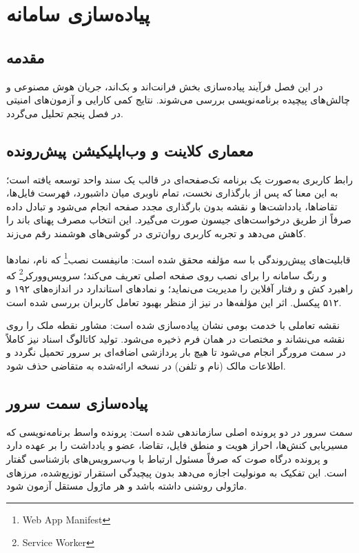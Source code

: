 \documentclass[11pt, a4paper]{report}
\newcommand{\enfootnote}[1]{\footnote{\foreignlanguage{english}{#1}}}
\begin{document}
\chapter{پیاده‌سازی سامانه}

\section{مقدمه}
در این فصل فرآیند پیاده‌سازی بخش فرانت‌اند و بک‌اند، جریان هوش مصنوعی و چالش‌های پیچیده برنامه‌نویسی بررسی می‌شوند. نتایج کمی کارایی و آزمون‌های امنیتی در فصل پنجم تحلیل می‌گردد.

\section{معماری کلاینت و وب‌اپلیکیشن پیش‌رونده}
رابط کاربری به‌صورت یک برنامه تک‌صفحه‌ای در قالب یک سند واحد توسعه یافته است؛ به این معنا که پس از بارگذاری نخست، تمام ناوبری میان داشبورد، فهرست فایل‌ها، تقاضاها، یادداشت‌ها و نقشه بدون بارگذاری مجدد صفحه انجام می‌شود و تبادل داده صرفاً از طریق درخواست‌های جیسون صورت می‌گیرد. این انتخاب مصرف پهنای باند را کاهش می‌دهد و تجربه کاربری روان‌تری در گوشی‌های هوشمند رقم می‌زند.

قابلیت‌های پیش‌روندگی با سه مؤلفه محقق شده است: مانیفست نصب\enfootnote{Web App Manifest} که نام، نمادها و رنگ سامانه را برای نصب روی صفحه اصلی تعریف می‌کند؛ سرویس‌وورکر\enfootnote{Service Worker} که راهبرد کش و رفتار آفلاین را مدیریت می‌نماید؛ و نمادهای استاندارد در اندازه‌های ۱۹۲ و ۵۱۲ پیکسل. اثر این مؤلفه‌ها در \cite{pwa} نیز از منظر بهبود تعامل کاربران بررسی شده است.

نقشه تعاملی با خدمت بومی نشان پیاده‌سازی شده است: مشاور نقطه ملک را روی نقشه می‌نشاند و مختصات در همان فرم ذخیره می‌شود. تولید کاتالوگ اسناد نیز کاملاً در سمت مرورگر انجام می‌شود تا هیچ بار پردازشی اضافه‌ای بر سرور تحمیل نگردد و اطلاعات مالک (نام و تلفن) در نسخه ارائه‌شده به متقاضی حذف شود.

\section{پیاده‌سازی سمت سرور}
سمت سرور در دو پرونده اصلی سازماندهی شده است: پرونده واسط برنامه‌نویسی که مسیریابی کنش‌ها، احراز هویت و منطق فایل، تقاضا، عضو و یادداشت را بر عهده دارد و پرونده درگاه صوت که صرفاً مسئول ارتباط با وب‌سرویس‌های بازشناسی گفتار است. این تفکیک به مونولیت اجازه می‌دهد بدون پیچیدگی استقرار توزیع‌شده، مرزهای ماژولی روشنی داشته باشد و هر ماژول مستقل آزمون شود.
\end{document}

